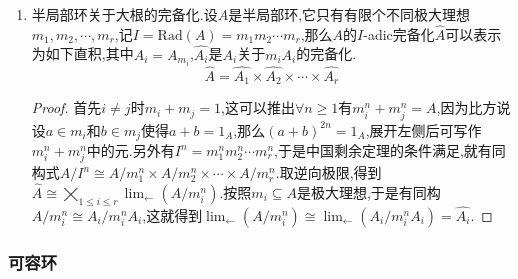 \begin{enumerate}
\begin{proof}
    	(a)推(e)是Krull相交定理,(e)推(b)平凡,(b)推(c):我们解释过$\widehat{A}$是平坦$A$代数,于是仅需验证对每个极大理想$m$有$m\widehat{A}\not=\widehat{A}$.按照零理想是闭集,说明$\cap_n m^n\widehat{A}=0$,于是典范映射$\psi:A\to\widehat{A}$是单射.于是$A\subset\widehat{A}$的子空间拓扑和$A$上的$I$-adic拓扑是一致的.于是$mA$是$A$中闭集并且它在$\widehat{A}$中闭包就是$m\widehat{A}$.于是$m\widehat{A}\cap A=mA\not=A$,于是$m\widehat{A}\not=\widehat{A}$.
    	
    	\qquad
    	
    	
    	(c)和(d)等价是因为(c)等价于对任意有限$A$模$M$有$M\to\widehat{M}$是单射,也即对任意有限$A$模$M$有它的$I$-adic拓扑是可分的.最后证明(c)推(a):按照$\widehat{A}$是忠实平坦$A$代数,说明典范映射$\psi:A\to\widehat{A}$是单射.并且对每个极大理想$m\subseteq A$,有$m\widehat{A}\not=\widehat{A}$,于是有$m\widehat{A}\cap A=m$(忠实平坦下有$m^{ec}=m$).再按照$\widehat{A}$是$I\widehat{A}$完备的,于是$I\widehat{A}\subset\mathrm{Rad}(\widehat{A})$,于是$m\widehat{A}$是$\widehat{A}$的闭集.于是$m$是$A$的闭集,按照闭包公式就有$\cap_n(m+I^n)=m$.这个等式推出$I\subseteq m$,按照极大理想$m$的任意性,于是$I\subset\mathrm{Rad}(A)$.
    \end{proof}
    \item 半局部环关于大根的完备化.设$A$是半局部环,它只有有限个不同极大理想$m_1,m_2,\cdots,m_r$,记$I=\mathrm{Rad}(A)=m_1m_2\cdots m_r$,那么$A$的$I$-adic完备化$\widehat{A}$可以表示为如下直积,其中$A_i=A_{m_i}$,$\widehat{A_i}$是$A_i$关于$m_iA_i$的完备化.
    $$\widehat{A}=\widehat{A_1}\times\widehat{A_2}\times\cdots\times\widehat{A_r}$$
    \begin{proof}
    	
    	首先$i\not=j$时$m_i+m_j=1$,这可以推出$\forall n\ge1$有$m_i^n+m_j^n=A$,因为比方说设$a\in m_i$和$b\in m_j$使得$a+b=1_A$,那么$(a+b)^{2n}=1_A$,展开左侧后可写作$m_i^n+m_j^n$中的元.另外有$I^n=m_1^nm_2^n\cdots m_r^n$,于是中国剩余定理的条件满足,就有同构式$A/I^n\cong A/m_1^n\times A/m_2^n\times\cdots\times A/m_r^n$.取逆向极限,得到$\widehat{A}\cong\bigtimes_{1\le i\le r}\lim_{\leftarrow}(A/m_i^n)$.按照$m_i\subseteq A$是极大理想,于是有同构$A/m_i^n\cong A_i/m_i^nA_i$,这就得到$\lim_{\leftarrow}(A/m_i^n)\cong\lim_{\leftarrow}(A_i/m_i^nA_i)=\widehat{A_i}$.
    \end{proof}
\end{enumerate}
\subsubsection{可容环}

